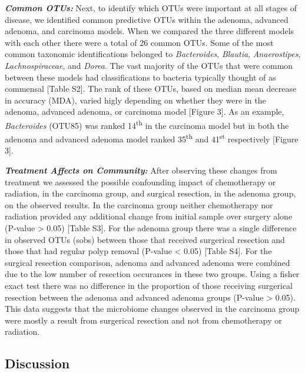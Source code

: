 \documentclass[12pt,]{article}
\begin{document}
\textbf{\emph{Common OTUs:}} Next, to identify which OTUs were important
at all stages of disease, we identified common predictive OTUs within
the adenoma, advanced adenoma, and carcinoma models. When we compared
the three different models with each other there were a total of 26
common OTUs. Some of the most common taxonomic identifications belonged
to \emph{Bacteroides}, \emph{Blautia}, \emph{Anaerostipes},
\emph{Lachnospiraceae}, and \emph{Dorea}. The vast majority of the OTUs
that were common between these models had classifications to bacteria
typically thought of as commensal {[}Table S2{]}. The rank of these
OTUs, based on median mean decrease in accuracy (MDA), varied higly
depending on whether they were in the adenoma, advanced adenoma, or
carcinoma model {[}Figure 3{]}. As an example, \emph{Bacteroides}
(OTU85) was ranked 14\textsuperscript{th} in the carcinoma model but in
both the adenoma and advanced adenoma model ranked
35\textsuperscript{th} and 41\textsuperscript{st} respectively {[}Figure
3{]}.

\textbf{\emph{Treatment Affects on Community:}} After observing these
changes from treatment we assessed the possible confounding impact of
chemotherapy or radiation, in the carcinoma group, and surgical
resection, in the adenoma group, on the observed results. In the
carcinoma group neither chemotherapy nor radiation provided any
additional change from initial sample over surgery alone (P-value
\textgreater{} 0.05) {[}Table S3{]}. For the adenoma group there was a
single difference in observed OTUs (sobs) between those that received
surgerical resection and those that had regular polyp removal (P-value
\textless{} 0.05) {[}Table S4{]}. For the surgical resection comparison,
adenoma and advanced adenoma were combined due to the low number of
resection occurances in these two groups. Using a fisher exact test
there was no difference in the proportion of those receiving surgerical
resection between the adenoma and advanced adenoma groups (P-value
\textgreater{} 0.05). This data suggests that the microbiome changes
observed in the carcinoma group were mostly a result from surgerical
resection and not from chemotherapy or radiation.

\newpage

\subsection{Discussion}\label{discussion}
\end{document}
